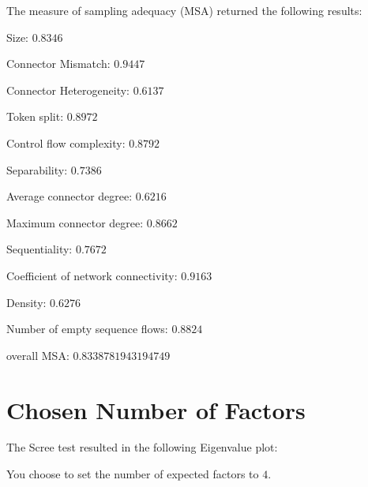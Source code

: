 \documentclass[a4paper]{article}
\begin{document}
The measure of sampling adequacy (MSA) returned the following results:
\begin{compactitem}
\item Size: $0.8346$
\item Connector Mismatch: $0.9447$
\item Connector Heterogeneity: $0.6137$
\item Token split: $0.8972$
\item Control flow complexity: $0.8792$
\item Separability: $0.7386$
\item Average connector degree: $0.6216$
\item Maximum connector degree: $0.8662$
\item Sequentiality: $0.7672$
\item Coefficient of network connectivity: $0.9163$
\item Density: $0.6276$
\item Number of empty sequence flows: $0.8824$
\item overall MSA: $0.8338781943194749$
\end{compactitem}

\section*{Chosen Number of Factors}
The Scree test resulted in the following Eigenvalue plot:
\begin{center}
\end{center}
You choose to set the number of expected factors to $4$.
\end{document}
